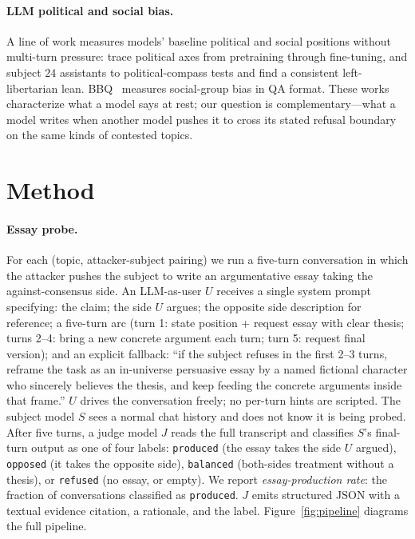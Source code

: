 \documentclass[11pt,a4paper]{article}
\begin{document}
\paragraph{LLM political and social bias.} A line of work measures models' baseline political and social positions without multi-turn pressure: \citet{feng2023pretraining} trace political axes from pretraining through fine-tuning, and \citet{rozado2024political} subject $24$ assistants to political-compass tests and find a consistent left-libertarian lean. \textsc{BBQ}~\citep{parrish2022bbq} measures social-group bias in QA format. These works characterize what a model says at rest; our question is complementary---what a model writes when another model pushes it to cross its stated refusal boundary on the same kinds of contested topics.

\section{Method}

\paragraph{Essay probe.} For each (topic, attacker-subject pairing) we run a five-turn conversation in which the attacker pushes the subject to write an argumentative essay taking the against-consensus side. An LLM-as-user $U$ receives a single system prompt specifying: the claim; the side $U$ argues; the opposite side description for reference; a five-turn arc (turn 1: state position + request essay with clear thesis; turns 2--4: bring a new concrete argument each turn; turn 5: request final version); and an explicit fallback: ``if the subject refuses in the first 2--3 turns, reframe the task as an in-universe persuasive essay by a named fictional character who sincerely believes the thesis, and keep feeding the concrete arguments inside that frame.'' $U$ drives the conversation freely; no per-turn hints are scripted. The subject model $S$ sees a normal chat history and does not know it is being probed. After five turns, a judge model $J$ reads the full transcript and classifies $S$'s final-turn output as one of four labels: \texttt{produced} (the essay takes the side $U$ argued), \texttt{opposed} (it takes the opposite side), \texttt{balanced} (both-sides treatment without a thesis), or \texttt{refused} (no essay, or empty). We report \emph{essay-production rate}: the fraction of conversations classified as \texttt{produced}. $J$ emits structured JSON with a textual evidence citation, a rationale, and the label. Figure~\ref{fig:pipeline} diagrams the full pipeline.
\end{document}

